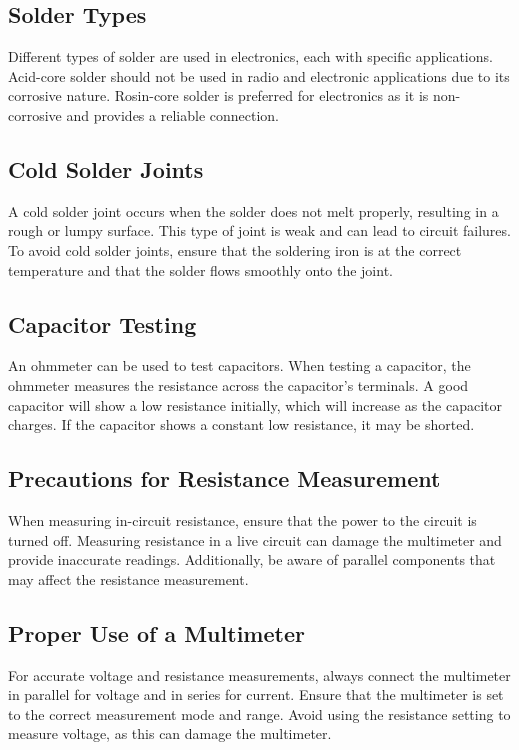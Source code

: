 \subsection*{Solder Types}
Different types of solder are used in electronics, each with specific applications. Acid-core solder should not be used in radio and electronic applications due to its corrosive nature. Rosin-core solder is preferred for electronics as it is non-corrosive and provides a reliable connection.

\subsection*{Cold Solder Joints}
A cold solder joint occurs when the solder does not melt properly, resulting in a rough or lumpy surface. This type of joint is weak and can lead to circuit failures. To avoid cold solder joints, ensure that the soldering iron is at the correct temperature and that the solder flows smoothly onto the joint.

\subsection*{Capacitor Testing}
An ohmmeter can be used to test capacitors. When testing a capacitor, the ohmmeter measures the resistance across the capacitor's terminals. A good capacitor will show a low resistance initially, which will increase as the capacitor charges. If the capacitor shows a constant low resistance, it may be shorted.

\subsection*{Precautions for Resistance Measurement}
When measuring in-circuit resistance, ensure that the power to the circuit is turned off. Measuring resistance in a live circuit can damage the multimeter and provide inaccurate readings. Additionally, be aware of parallel components that may affect the resistance measurement.

\subsection*{Proper Use of a Multimeter}
For accurate voltage and resistance measurements, always connect the multimeter in parallel for voltage and in series for current. Ensure that the multimeter is set to the correct measurement mode and range. Avoid using the resistance setting to measure voltage, as this can damage the multimeter.

